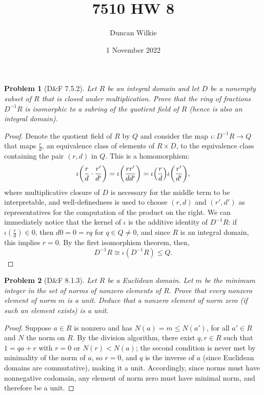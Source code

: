 \documentclass{article}
\title{7510 HW 8}
\author{Duncan Wilkie}
\date{1 November 2022}
\newtheorem{plm}{Problem}
\begin{document}
\maketitle

\begin{plm}[D\&F 7.5.2]
  Let $R$ be an integral domain and let $D$ be a nonempty subset of $R$ that is closed under multiplication.
  Prove that the ring of fractions $D^{-1}R$ is isomorphic to a subring of the quotient field of $R$ (hence is also an integral domain).
\end{plm}

\begin{proof}
  Denote the quotient field of $R$ by $Q$ and consider the map $\iota: D^{-1}R \to Q$ that maps $\frac{r}{d}$,
  an equivalence class of elements of $R \times D$, to the equivalence class containing the pair $(r, d)$ in $Q$.
  This is a homomorphism:
  \[
    \iota\qty(\frac{r}{d} \cdot \frac{r'}{d'}) = \iota\qty(\frac{rr'}{dd'}) = \iota\qty(\frac{r}{d})\iota\qty(\frac{r'}{d'}),
  \]
  where multiplicative closure of $D$ is necessary for the middle term to be interpretable,
  and well-definedness is used to choose $(r, d)$ and $(r', d')$ as representatives for the computation of the product on the right.
  We can immediately notice that the kernel of $\iota$ is the additive identity of $D^{-1}R$: if $\iota(\frac{r}{d}) \in 0$,
  then $d0 = 0 = rq$ for $q \in Q \neq 0$, and since $R$ is an integral domain, this implies $r = 0$.
  By the first isomorphism theorem, then,
  \[
    D^{-1}R \cong \iota(D^{-1}R) \leq Q.
  \]
\end{proof}

\begin{plm}[D\&F 8.1.3]
  Let $R$ be a Euclidean domain.
  Let $m$ be the minimum integer in the set of norms of nonzero elements of $R$.
  Prove that every nonzero element of norm $m$ is a unit.
  Deduce that a nonzero element of norm zero (if such an element exists) is a unit.
\end{plm}

\begin{proof}
  Suppose $a \in R$ is nonzero and has $N(a) = m \leq N(a')$, for all $a' \in R$ and $N$ the norm on $R$.
  By the division algorithm, there exist $q,r \in R$ such that $1 = qa + r$ with $r  = 0$ or $N(r) < N(a)$;
  the second condition is never met by minimality of the norm of $a$, so $r = 0$, and $q$ is the inverse of $a$ (since Euclidean domains are commutative),
  making it a unit.
  Accordingly, since norms must have nonnegative codomain, any element of norm zero must have minimal norm, and therefore be a unit.
\end{proof}
\end{document}
